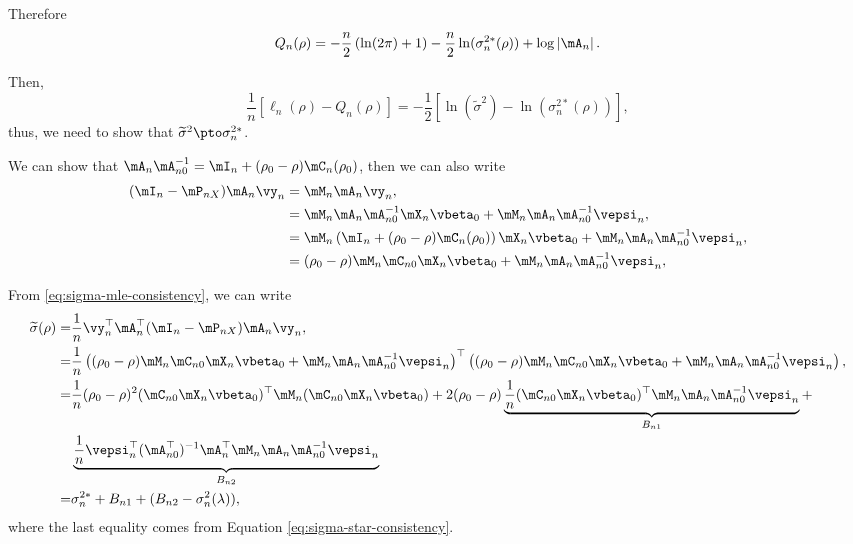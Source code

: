 \begin{subappendices}
Therefore
\begin{equation*}
  Q_n(\rho) = -\frac{n}{2}\left(\ln(2\pi) + 1\right) - \frac{n}{2}\ln(\sigma^{2*}_n(\rho)) + \log\left|\mA_n\right|.
\end{equation*}

Then, 
\begin{equation}
\frac{1}{n}\left[\ell_n(\rho) - Q_n(\rho)\right] = -\frac{1}{2}\left[\ln( \widetilde{\sigma}^{2}) - \ln(\sigma^{2*}_n(\rho)) \right],
\end{equation}
%
thus, we need to show that $\widetilde{\sigma}^{2}\pto \sigma^{2*}_n$. 

We can show that $\mA_n\mA_{n0}^{-1} = \mI_n + (\rho_0 - \rho)\mC_n(\rho_0)$, then we can also write
\begin{equation*}
\begin{aligned}
  (\mI_n - \mP_{nX})\mA_n\vy_n & = \mM_n\mA_n\vy_n, \\
                               & = \mM_n\mA_n\mA_{n0}^{-1}\mX_n\vbeta_0 + \mM_n\mA_n\mA_{n0}^{-1}\vepsi_n, \\
& = \mM_n\left(\mI_n + (\rho_0 - \rho)\mC_n(\rho_0)\right)\mX_n\vbeta_0 + \mM_n\mA_n\mA_{n0}^{-1}\vepsi_n,       \\
& = (\rho_0 - \rho)\mM_n\mC_{n0}\mX_n\vbeta_0 + \mM_n\mA_n\mA_{n0}^{-1}\vepsi_n, 
\end{aligned}
\end{equation*}

From \eqref{eq:sigma-mle-consistency}, we can write
\begin{equation*}
\begin{aligned}
\widetilde{\sigma}(\rho)  = & \frac{1}{n}\vy_n^\top\mA_n^\top(\mI_n - \mP_{nX})\mA_n\vy_n, \\
 = & \frac{1}{n}\left((\rho_0 - \rho)\mM_n\mC_{n0}\mX_n\vbeta_0 + \mM_n\mA_n\mA_{n0}^{-1}\vepsi_n \right)^\top \left((\rho_0 - \rho)\mM_n\mC_{n0}\mX_n\vbeta_0 + \mM_n\mA_n\mA_{n0}^{-1}\vepsi_n \right), \\
 = & \frac{1}{n}(\rho_0 - \rho)^2(\mC_{n0}\mX_n\vbeta_0)^\top\mM_n(\mC_{n0}\mX_n\vbeta_0) + 2(\rho_0 - \rho)\underbrace{\frac{1}{n}(\mC_{n0}\mX_n\vbeta_0)^\top\mM_n\mA_n\mA_{n0}^{-1}\vepsi_n}_{B_{n1}} +  \\
& \underbrace{\frac{1}{n}\vepsi_n^\top(\mA_{n0}^\top)^{-1}\mA_n^\top\mM_n\mA_n\mA_{n0}^{-1}\vepsi_n}_{B_{n2}} \\
= & \sigma^{2*}_n + B_{n1} + (B_{n2} - \sigma^2_n(\lambda)), 
\end{aligned}
\end{equation*}
%
where the last equality comes from Equation \eqref{eq:sigma-star-consistency}. 


\end{subappendices}

